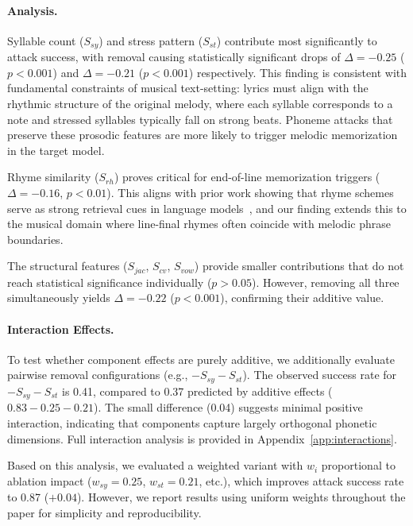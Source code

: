 \paragraph{Analysis.}
Syllable count ($S_{sy}$) and stress pattern ($S_{st}$) contribute most significantly to attack success, with removal causing statistically significant drops of $\Delta = -0.25$ ($p < 0.001$) and $\Delta = -0.21$ ($p < 0.001$) respectively. This finding is consistent with fundamental constraints of musical text-setting: lyrics must align with the rhythmic structure of the original melody, where each syllable corresponds to a note and stressed syllables typically fall on strong beats. Phoneme attacks that preserve these prosodic features are more likely to trigger melodic memorization in the target model.

Rhyme similarity ($S_{rh}$) proves critical for end-of-line memorization triggers ($\Delta = -0.16$, $p < 0.01$). This aligns with prior work showing that rhyme schemes serve as strong retrieval cues in language models~\cite{carlini2021extracting}, and our finding extends this to the musical domain where line-final rhymes often coincide with melodic phrase boundaries.

The structural features ($S_{jac}$, $S_{cv}$, $S_{vow}$) provide smaller contributions that do not reach statistical significance individually ($p > 0.05$). However, removing all three simultaneously yields $\Delta = -0.22$ ($p < 0.001$), confirming their additive value.

\paragraph{Interaction Effects.}
To test whether component effects are purely additive, we additionally evaluate pairwise removal configurations (e.g., $-S_{sy} - S_{st}$). The observed success rate for $-S_{sy} - S_{st}$ is 0.41, compared to 0.37 predicted by additive effects ($0.83 - 0.25 - 0.21$). The small difference (0.04) suggests minimal positive interaction, indicating that components capture largely orthogonal phonetic dimensions. Full interaction analysis is provided in Appendix~\ref{app:interactions}.

Based on this analysis, we evaluated a weighted variant with $w_i$ proportional to ablation impact ($w_{sy} = 0.25$, $w_{st} = 0.21$, etc.), which improves attack success rate to 0.87 ($+0.04$). However, we report results using uniform weights throughout the paper for simplicity and reproducibility.

